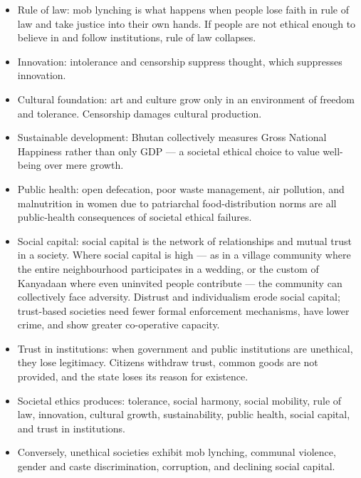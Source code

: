 \begin{itemize}
\item Rule of law: mob lynching is what happens when people lose faith in rule of law and take justice into their own hands. If people are not ethical enough to believe in and follow institutions, rule of law collapses.
\item Innovation: intolerance and censorship suppress thought, which suppresses innovation.
\item Cultural foundation: art and culture grow only in an environment of freedom and tolerance. Censorship damages cultural production.
\item Sustainable development: Bhutan collectively measures Gross National Happiness rather than only GDP --- a societal ethical choice to value well-being over mere growth.
\item Public health: open defecation, poor waste management, air pollution, and malnutrition in women due to patriarchal food-distribution norms are all public-health consequences of societal ethical failures.
\item Social capital: social capital is the network of relationships and mutual trust in a society. Where social capital is high --- as in a village community where the entire neighbourhood participates in a wedding, or the custom of Kanyadaan where even uninvited people contribute --- the community can collectively face adversity. Distrust and individualism erode social capital; trust-based societies need fewer formal enforcement mechanisms, have lower crime, and show greater co-operative capacity.
\item Trust in institutions: when government and public institutions are unethical, they lose legitimacy. Citizens withdraw trust, common goods are not provided, and the state loses its reason for existence.
\end{itemize}

\begin{QuickRevision}
\begin{itemize}
\item Societal ethics produces: tolerance, social harmony, social mobility, rule of law, innovation, cultural growth, sustainability, public health, social capital, and trust in institutions.
\item Conversely, unethical societies exhibit mob lynching, communal violence, gender and caste discrimination, corruption, and declining social capital.
\end{itemize}
\end{QuickRevision}

